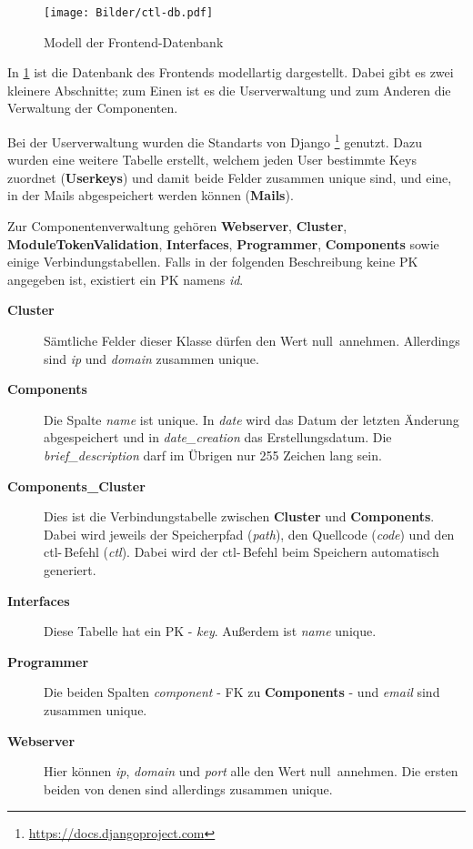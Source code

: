 \begin{figure}[H]
  \begin{center}
	\texttt{[image: Bilder/ctl-db.pdf]}
	\caption{Modell der Frontend-Datenbank}
	\label{fb_db}
  \end{center}
\end{figure}

In \ref{fb_db} ist die Datenbank des Frontends modellartig dargestellt. Dabei
gibt es zwei kleinere Abschnitte; zum Einen ist es die Userverwaltung und zum
Anderen die Verwaltung der Componenten. 

Bei der Userverwaltung wurden die Standarts von Django
\footnote{\url{https://docs.djangoproject.com}} genutzt. Dazu wurden eine
weitere Tabelle erstellt, welchem jeden User bestimmte Keys zuordnet
(\textbf{Userkeys}) und damit beide Felder zusammen unique sind, und eine, in 
der Mails abgespeichert werden können (\textbf{Mails}).

Zur Componentenverwaltung gehören \textbf{Webserver}, \textbf{Cluster},
\textbf{ModuleTokenValidation}, \textbf{Interfaces}, \textbf{Programmer}, 
\textbf{Components} sowie einige Verbindungstabellen.
Falls in der folgenden Beschreibung keine PK angegeben ist, existiert ein PK
namens \textit{id}. 

\begin{description}
  \item[\textbf{Cluster}]
	Sämtliche Felder dieser Klasse dürfen den Wert \glqq null\grqq\ annehmen.
	Allerdings sind \textit{ip} und \textit{domain} zusammen unique.
  \item[\textbf{Components}]
	Die Spalte \textit{name} ist unique. In \textit{date} wird das Datum der
	letzten Änderung abgespeichert und in \textit{date\_creation} das
	Erstellungsdatum. Die \textit{brief\_description} darf im Übrigen nur 255
	Zeichen lang sein.
  \item[\textbf{Components\_Cluster}]
	Dies ist die Verbindungstabelle zwischen \textbf{Cluster} und
	\textbf{Compo\-nents}. Dabei wird jeweils der Speicherpfad (\textit{path}),
	den Quellcode (\textit{code}) und den ctl-\,Befehl (\textit{ctl}). Dabei
	wird der ctl-\,Befehl beim Speichern automatisch generiert.
  \item[\textbf{Interfaces}]
	Diese Tabelle hat ein PK - \textit{key}. Außerdem ist \textit{name} unique.
  \item[\textbf{Programmer}]
	Die beiden Spalten \textit{component} - FK zu \textbf{Components} - und
	\textit{email} sind zusammen unique. 
  \item[\textbf{Webserver}]
	Hier können \textit{ip}, \textit{domain} und \textit{port} alle den Wert
	\glqq null\grqq\ annehmen. Die ersten beiden von denen sind allerdings
	zusammen unique.
\end{description}
